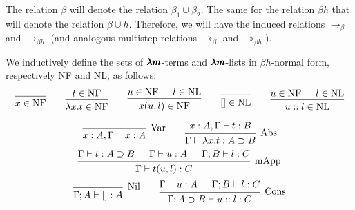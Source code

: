 \begin{notation}
  The relation $\beta$ will denote the relation $\beta_1 \cup \beta_2$.
  The same for the relation $\beta h$ that will denote the relation $\beta \cup h$.
  Therefore, we will have the induced relations $\to_\beta$ and $\to_{\beta h}$ (and analogous multistep relations $\twoheadrightarrow_\beta$ and $\twoheadrightarrow_{\beta h}$).
\end{notation}


\begin{definition}
  We inductively define the sets of $\pmb{\lambda m}$-terms and $\pmb{\lambda m}$-lists in $\beta h$-normal form, respectively NF and NL, as follows:
  \[
    \begin{prooftree}
      \infer0{ x \in \text{NF} }
    \end{prooftree}
    \qquad
    \begin{prooftree}
      \hypo{ t \in \text{NF} }
      \infer1{ \lambda x . t \in \text{NF} } 
    \end{prooftree}
    \qquad
    \begin{prooftree}
      \hypo{ u \in \text{NF} } 
      \hypo{ l \in \text{NL} }
      \infer2{ x(u, l) \in \text{NF} }
    \end{prooftree}
    \qquad
    \begin{prooftree}
      \infer0{ [] \in \text{NL} } 
    \end{prooftree}
    \qquad
    \begin{prooftree}
      \hypo{ u \in \text{NF} }
      \hypo{ l \in \text{NL} }
      \infer2{ u::l \in \text{NL} }
    \end{prooftree}
  \]
\end{definition}


\begin{definition}
  \[
    \begin{prooftree}
      \infer0[Var]{ x:A, \Gamma \vdash x:A } 
    \end{prooftree}
    \qquad
    \begin{prooftree}
      \hypo{ x:A, \Gamma \vdash t:B }
      \infer1[Abs]{ \Gamma \vdash \lambda x . t : A \supset B  } 
    \end{prooftree}
  \]
  \[
    \begin{prooftree}
      \hypo{ \Gamma \vdash t : A \supset B }
      \hypo{ \Gamma \vdash u : A }
      \hypo{ \Gamma ; B \vdash l : C }	
      \infer3[mApp]{ \Gamma \vdash t(u, l) : C } 
    \end{prooftree}
  \]
  \[
    \begin{prooftree}
      \infer0[Nil]{ \Gamma ; A \vdash []:A } 
    \end{prooftree}
    \qquad
    \begin{prooftree}
      \hypo{ \Gamma \vdash u:A }
      \hypo{ \Gamma ; B \vdash l:C }
      \infer2[Cons]{ \Gamma ; A \supset B \vdash  u::l : C } 
    \end{prooftree}
  \]
\end{definition}

